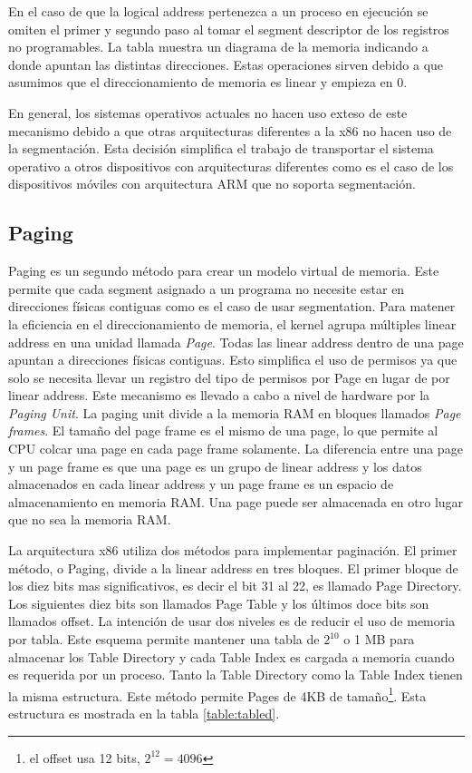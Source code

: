 En el caso de que la logical address pertenezca a un proceso en
ejecución se omiten el primer y segundo paso al tomar el segment descriptor de
los registros no programables. La tabla {} muestra un diagrama de la memoria
indicando a donde apuntan las distintas direcciones. Estas operaciones sirven
debido a que asumimos que el direccionamiento de memoria es linear y empieza en
0.

En general, los sistemas operativos actuales no hacen uso exteso de este
mecanismo debido a que otras arquitecturas diferentes a la x86 no hacen uso de
la segmentación. Esta decisión simplifica el trabajo de transportar el sistema
operativo a otros dispositivos con arquitecturas diferentes como es el caso de
los dispositivos móviles con arquitectura ARM que no soporta segmentación.

\subsection{Paging} 
Paging es un segundo método para crear un modelo virtual de memoria. Este
permite que cada segment asignado a un programa no necesite estar en
direcciones físicas contiguas como es el caso de usar segmentation. Para
matener la eficiencia en el direccionamiento de memoria, el kernel agrupa
múltiples linear address en una unidad llamada \emph{Page}. Todas las linear
address dentro de una page apuntan a direcciones físicas contiguas. Esto
simplifica el uso de permisos ya que solo se necesita llevar un registro del
tipo de permisos por Page en lugar de por linear address. Este mecanismo es
llevado a cabo a nivel de hardware por la \emph{Paging Unit}. La paging unit
divide a la memoria RAM en bloques llamados \emph{Page frames}. El tamaño del
page frame es el mismo de una page, lo que permite al CPU colcar una page en
cada page frame solamente. La diferencia entre una page y un page frame es que
una page es un grupo de linear address y los datos almacenados en cada linear
address y un page frame es un espacio de almacenamiento en memoria RAM. Una
page puede ser almacenada en otro lugar que no sea la memoria RAM.

La arquitectura x86 utiliza dos métodos para implementar paginación. El primer
método, o Paging, divide a la linear address en tres bloques. El primer bloque
de los diez bits mas significativos, es decir el bit 31 al 22, es llamado Page
Directory. Los siguientes diez bits son llamados Page Table y los últimos doce
bits son llamados offset. La intención de usar dos niveles es de reducir el uso
de memoria por tabla. Este esquema permite mantener una tabla de $2^10$ o 1 MB
para almacenar los Table Directory y cada Table Index es cargada a memoria
cuando es requerida por un proceso. Tanto la Table Directory como la Table
Index tienen la misma estructura. Este método permite Pages de 4KB de
tamaño\footnote{el offset usa 12 bits, $2^12=4096$}. Esta estructura es
mostrada en la tabla \ref{table:tabled}.

